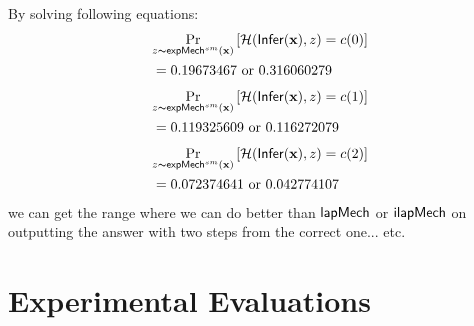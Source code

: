 \documentclass{article}
\begin{document}
By solving following equations:
\begin{align*}
 &\underset{z \thicksim \mathsf{expMech}^{sm}(\textbf{x})}{\Pr}\left[ \mathcal{H}(\mathsf{Infer}(\textbf{x}), z) = c(0)   \right] \\
 & = 0.19673467 \text{ or } 0.316060279
\end{align*}
\begin{align*}
  &\underset{z \thicksim \mathsf{expMech}^{sm}(\textbf{x})}{\Pr}\left[ \mathcal{H}(\mathsf{Infer}(\textbf{x}), z) = c(1)   \right]\\
  &= 0.119325609 \text{ or } 0.116272079
\end{align*}
\begin{align*}
 &\underset{z \thicksim \mathsf{expMech}^{sm}(\textbf{x})}{\Pr}\left[ \mathcal{H}(\mathsf{Infer}(\textbf{x}), z) = c(2)   \right]\\
 &=0.072374641 \text{ or }  0.042774107
\end{align*}
we can get the range where we can do better than $\mathsf{lapMech}$ or $\mathsf{ilapMech}$ on outputting the answer with two steps from the correct one... etc.


\section{Experimental Evaluations}
\label{sec_experiment}
\end{document}
